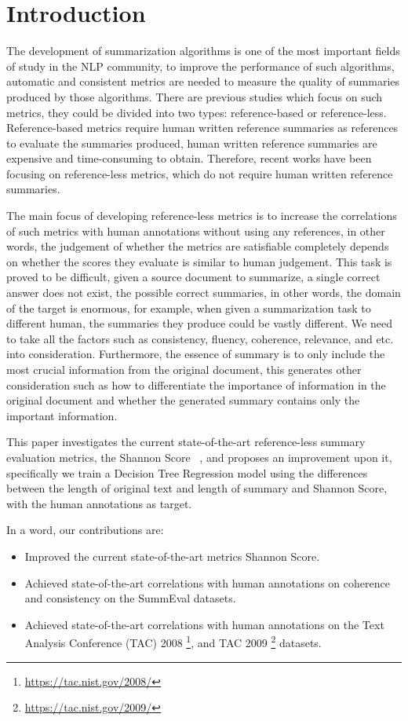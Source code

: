 \section{Introduction}
\label{sec:intro}

The development of summarization algorithms is one of the most important fields of study in the NLP community, to improve the performance of such algorithms, automatic and consistent metrics are needed to measure the quality of summaries produced by those algorithms. There are previous studies which focus on such metrics, they could be divided into two types: reference-based or reference-less. Reference-based metrics require human written reference summaries as references to evaluate the summaries produced, human written reference summaries are expensive and time-consuming to obtain. Therefore, recent works have been focusing on reference-less metrics, which do not require human written reference summaries. 

The main focus of developing reference-less metrics is to increase the correlations of such metrics with human annotations without using any references, in other words, the judgement of whether the metrics are satisfiable completely depends on whether the scores they evaluate is similar to human judgement. This task is proved to be difficult, given a source document to summarize, a single correct answer does not exist, the possible correct summaries, in other words, the domain of the target is enormous, for example, when given a summarization task to different human, the summaries they produce could be vastly different. We need to take all the factors such as consistency, fluency, coherence, relevance, and etc. into consideration. Furthermore, the essence of summary is to only include the most crucial information from the original document, this generates other consideration such as how to differentiate the importance of information in the original document and whether the generated summary contains only the important information.

This paper investigates the current state-of-the-art reference-less summary evaluation metrics, the Shannon Score ~\cite{shannonscore}, and proposes an improvement upon it, specifically we train a Decision Tree Regression model using the differences between the length of original text and length of summary and Shannon Score, with the human annotations as target. 

In a word, our contributions are:
\begin{itemize}
	\item Improved the current state-of-the-art metrics Shannon Score.
	\item Achieved state-of-the-art correlations with human annotations on coherence and consistency on the SummEval datasets.
	\item Achieved state-of-the-art correlations with human annotations on the Text Analysis Conference (TAC) 2008 \footnote{\url{https://tac.nist.gov/2008/}}, and TAC 2009 \footnote{\url{https://tac.nist.gov/2009/}} datasets.
\end{itemize}
